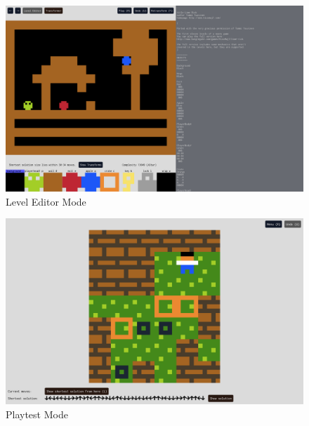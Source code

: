 
\begin{figure}
\centering
\includegraphics[width=1.0\linewidth]{figures/leveleditormode.png}
\caption[LevelEditor]{Level Editor Mode\label{fig:leveleditormode}}
\end{figure}


\begin{figure}
\centering
\includegraphics[width=1.0\linewidth]{figures/playtestmode.png}
\caption[Playtest]{Playtest Mode\label{fig:playtestmode}}
\end{figure}

